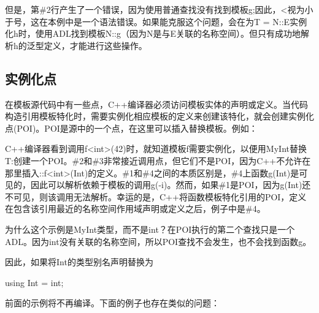 但是，第\#2行产生了一个错误，因为使用普通查找没有找到模板g;因此，<视为小于号，这在本例中是一个语法错误。如果能克服这个问题，会在为T = N::E实例化h时，使用ADL找到模板N::g（因为N是与E关联的名称空间）。但只有成功地解析h的泛型定义，才能进行这些操作。

\subsection{实例化点}

在模板源代码中有一些点，C++编译器必须访问模板实体的声明或定义。当代码构造引用模板特化时，需要实例化相应模板的定义来创建该特化，就会创建实例化点(POI)。POI是源中的一个点，在这里可以插入替换模板。例如：


C++编译器看到调用f<int>(42)时，就知道模板f需要实例化，以便用MyInt替换T:创建一个POI。\#2和\#3非常接近调用点，但它们不是POI，因为C++不允许在那里插入::f<int>(Int)的定义。\#1和\#4之间的本质区别是，\#4上函数g(Int)是可见的，因此可以解析依赖于模板的调用g(-i)。然而，如果\#1是POI，因为g(Int)还不可见，则该调用无法解析。幸运的是，C++将函数模板特化引用的POI，定义在包含该引用最近的名称空间作用域声明或定义之后，例子中是\#4。

为什么这个示例是MyInt类型，而不是int？在POI执行的第二个查找只是一个ADL。因为int没有关联的名称空间，所以POI查找不会发生，也不会找到函数g。

因此，如果将Int的类型别名声明替换为

\begin{cpp}
using Int = int;
\end{cpp}

前面的示例将不再编译。下面的例子也存在类似的问题：



